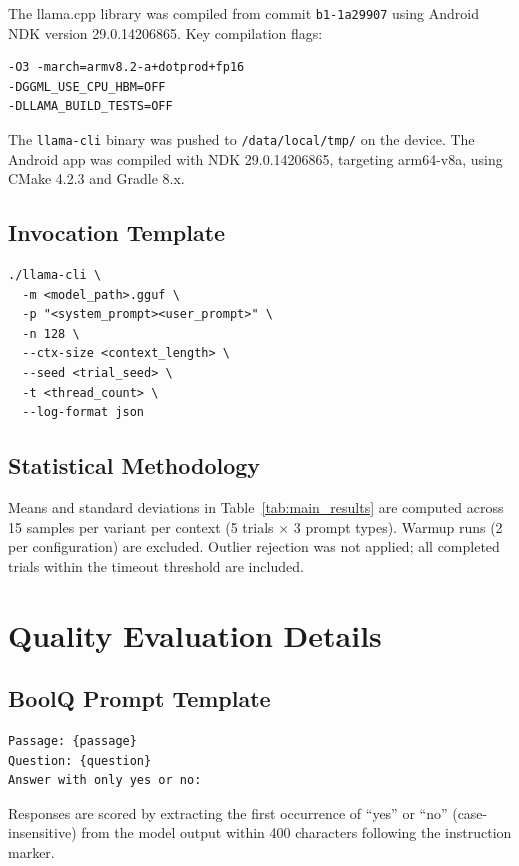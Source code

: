 \documentclass[conference]{IEEEtran}
\begin{document}
The llama.cpp library was compiled from commit \texttt{b1-1a29907} using
Android NDK version 29.0.14206865. Key compilation flags:
\begin{verbatim}
-O3 -march=armv8.2-a+dotprod+fp16
-DGGML_USE_CPU_HBM=OFF
-DLLAMA_BUILD_TESTS=OFF
\end{verbatim}

The \texttt{llama-cli} binary was pushed to \texttt{/data/local/tmp/} on
the device. The Android app was compiled with NDK 29.0.14206865, targeting
arm64-v8a, using CMake 4.2.3 and Gradle 8.x.

\subsection{Invocation Template}

\begin{verbatim}
./llama-cli \
  -m <model_path>.gguf \
  -p "<system_prompt><user_prompt>" \
  -n 128 \
  --ctx-size <context_length> \
  --seed <trial_seed> \
  -t <thread_count> \
  --log-format json
\end{verbatim}

\subsection{Statistical Methodology}

Means and standard deviations in Table~\ref{tab:main_results} are computed
across 15 samples per variant per context (5 trials $\times$ 3 prompt types).
Warmup runs (2 per configuration) are excluded. Outlier rejection was not
applied; all completed trials within the timeout threshold are included.

\section{Quality Evaluation Details}

\subsection{BoolQ Prompt Template}

\begin{verbatim}
Passage: {passage}
Question: {question}
Answer with only yes or no:
\end{verbatim}

Responses are scored by extracting the first occurrence of ``yes'' or ``no''
(case-insensitive) from the model output within 400 characters following
the instruction marker.
\end{document}

